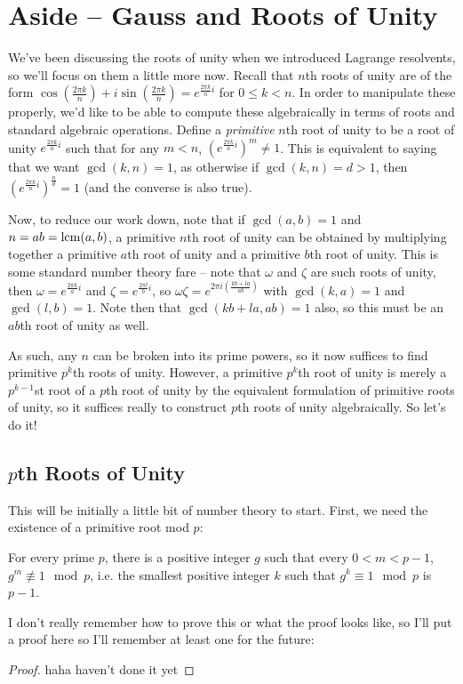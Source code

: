 \documentclass[12pt]{scrartcl}
\begin{document}
\section{Aside -- Gauss and Roots of Unity}
We've been discussing the roots of unity when we introduced Lagrange resolvents, so we'll focus on them a little more now. Recall that $n$th roots of unity are of the form $\cos\left(\frac{2\pi k} n \right) + i \sin \left( \frac{2\pi k} n \right) = e^{\frac{2\pi k}n i}$ for $0 \leq k < n$. In order to manipulate these properly, we'd like to be able to compute these algebraically in terms of roots and standard algebraic operations. Define a \textit{primitive} $n$th root of unity to be a root of unity $e^{\frac{2\pi k}n i}$ such that for any $m < n$, $(e^{\frac{2\pi k}n i})^m \neq 1$. This is equivalent to saying that we want $\gcd(k, n) = 1$, as otherwise if $\gcd(k, n) = d > 1$, then $(e^{\frac{2\pi k}n i})^{\frac n d} = 1$ (and the converse is also true). 

Now, to reduce our work down, note that if $\gcd(a, b) = 1$ and $n = ab = \operatorname*{lcm}(a, b)$, a primitive $n$th root of unity can be obtained by multiplying together a primitive $a$th root of unity and a primitive $b$th root of unity. This is some standard number theory fare -- note that $\omega$ and $\zeta$ are such roots of unity, then $\omega = e^{\frac{2\pi k}a i}$ and $\zeta = e^{\frac{2\pi l}b i}$, so $\omega \zeta = e^{2\pi i (\frac {kb + la}{ab})}$ with $\gcd(k, a) = 1$ and $\gcd(l, b) = 1$. Note then that $\gcd(kb + la, ab) = 1$ also, so this must be an $ab$th root of unity as well. 

As such, any $n$ can be broken into its prime powers, so it now suffices to find primitive $p^k$th roots of unity. However, a primitive $p^k$th root of unity is merely a $p^{k-1}$st root of a $p$th root of unity by the equivalent formulation of primitive roots of unity, so it suffices really to construct $p$th roots of unity algebraically. So let's do it!  

\subsection{$p$th Roots of Unity}
This will be initially a little bit of number theory to start. First, we need the existence of a primitive root mod $p$: 
\begin{lemma}
For every prime $p$, there is a positive integer $g$ such that every $0 < m < p-1$, $g^m \not\equiv 1 \mod p$, i.e. the smallest positive integer $k$ such that $g^k \equiv 1 \mod p$ is $p-1$. 
\end{lemma}
I don't really remember how to prove this or what the proof looks like, so I'll put a proof here so I'll remember at least one for the future: 
\begin{proof}
haha haven't done it yet
\end{proof}
\end{document}
